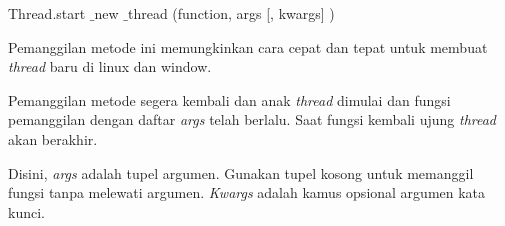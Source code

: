 \noindent 
\begin{center}{\fontsize{9pt}{9pt}\selectfont Thread.start $  \_  $new $  \_  $thread (function, args [, kwargs] )}\end{center} \par
Pemanggilan metode ini memungkinkan cara cepat dan tepat untuk membuat \textit{thread} baru di linux dan window. \par
Pemanggilan metode segera kembali dan anak  \textit{thread} dimulai dan fungsi pemanggilan dengan daftar \textit{args} telah berlalu. Saat fungsi kembali ujung \textit{thread} akan berakhir.   \par
Disini, \textit{args }adalah tupel argumen. Gunakan tupel kosong untuk memanggil fungsi tanpa melewati argumen. \textit{Kwargs} adalah kamus opsional argumen kata kunci.  \par
\noindent 
\par
\noindent 




\newpage

